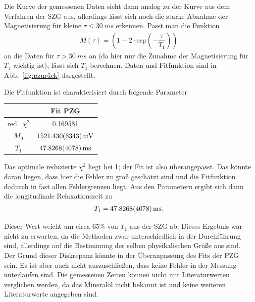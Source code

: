 \documentclass[10pt]{article}
\newenvironment{Figure}
  {\par\medskip\noindent\minipage{\linewidth}}
  {\endminipage\par\medskip}
\begin{document}
\begin{multicols}{2}
Die Kurve der gemessenen Daten sieht dann analog zu der Kurve aus dem Verfahren der SZG aus, allerdings lässt sich noch die starke Abnahme der Magnetisierung für kleine $\tau \leq \SI{30}{ms}$ erkennen.
Passt man die Funktion
\begin{align} 
        M\left(\tau \right)=\left(1-2\cdot \text{ecp}\left(-\dfrac{\tau }{T_1}\right)\right)
\end{align} 
an die Daten für $\tau >\SI{30}{ms}$ an (da hier nur die Zunahme der Magnetisierung für $T_1$ wichtig ist), lässt sich $T_1$ berechnen.
Daten und Fitfunktion sind in Abb.\ \ref{fig:pzurück} dargestellt.
  \begin{Figure}
    \centering\resizebox{\textwidth}{!}{}
    \label{fig:pzurück}
  \end{Figure}
Die Fitfunktion ist charakterisiert durch folgende Parameter
  \begin{center}
    \begin{tabular}{c|c}
    & Fit PZG\\
    \hline
    red.\ $\chi^2$ & 0.169581\\
    $M_0$ & $\SI{1521.43+-6.343}{mV}$ \\
    $T_1$ & $\SI{47.8268+-0.4078}{ms}$ 
    \end{tabular}
  \label{Tab:PZG_para}
  \end{center}
Das optimale reduzierte $\chi ^2$ liegt bei 1; der Fit ist also überangepasst.
Das könnte daran liegen, dass hier die Fehler zu groß geschätzt sind und die Fitfunktion dadurch in fast allen Fehlergrenzen liegt.
Aus den Parametern ergibt sich dann die longitudinale Relaxationszeit zu
\begin{align} 
        T_1=\SI{47.8268+-0.4078}{ms}
.\end{align} 

Dieser Wert weicht um circa $65\%$ von $T_1$ aus der SZG ab.
Dieses Ergebnis war nicht zu erwarten, da die Methoden zwar unterschiedlich in der Durchführung sind, allerdings auf die Bestimmung der selben physikalischen Größe aus sind.
Der Grund dieser Diskrepanz könnte in der Überanpassung des Fits der PZG sein.
Es ist aber auch nicht auszuschließen, dass keine Fehler in der Messung unterlaufen sind.
Die gemessenen Zeiten können nicht mit Literaturwerten verglichen werden, da das Mineralöl nicht bekannt ist und keine weiteren Literaturwerte angegeben sind.


\end{multicols}
\end{document}
